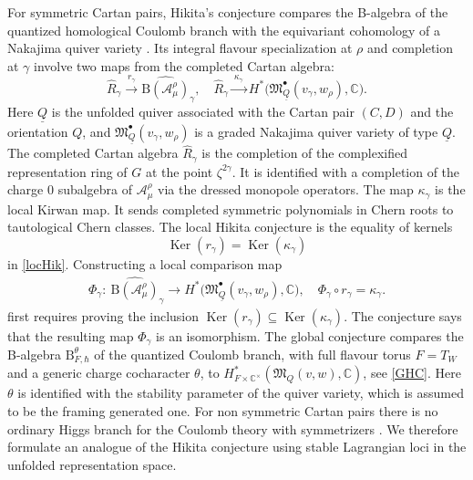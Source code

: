 \documentclass[11pt,reqno]{amsart}
\theoremstyle{definition}
\theoremstyle{remark}
\def\bbC{\mathbb C}
\def\dQ{\underline Q}
\def\B{\mathrm B}
\def\calA{\mathcal A}
\def\Ker{\operatorname{Ker}}
\def\M{\mathfrak M}
\begin{document}
For symmetric Cartan pairs, Hikita's conjecture compares the B-algebra of the quantized homological Coulomb
branch with the equivariant cohomology of a Nakajima quiver variety
\cite{HikNotes}. Its integral flavour specialization at $\rho$ and completion
at $\gamma$ involve two maps from the completed Cartan algebra:
\[
 \widehat R_\gamma\xrightarrow{\ r_\gamma\ }
 \widehat{\B(\calA_\mu^\rho)}_\gamma,
 \quad
 \widehat R_\gamma\xrightarrow{\ \kappa_\gamma\ }
 H^*\bigl(\M_{\dQ}^\bullet(v_\gamma,w_\rho),\bbC\bigr).
\]
Here $\dQ$ is the unfolded quiver associated with the Cartan pair $(C,D)$ and the orientation $Q$,
and $\M_{\dQ}^\bullet(v_\gamma,w_\rho)$ is a graded Nakajima quiver
variety \cite{Nak01} of type $\dQ$. 
The completed Cartan algebra $\widehat R_\gamma$ is the completion of the complexified representation ring
of $G$ at the point $\zeta^{2\gamma}$.  
It is identified with a completion of the charge 0 subalgebra of $\calA_\mu^\rho$
via the dressed monopole operators.
The map $\kappa_\gamma$ is the local Kirwan map. It sends completed symmetric
polynomials in Chern roots to tautological Chern classes. The
{local Hikita conjecture} is the equality of kernels
$$\Ker( r_\gamma)=\Ker(\kappa_\gamma)$$ in \eqref{locHik}.
Constructing a local comparison map 
\begin{align}\label{Phigamma}
 \Phi_\gamma:\ \widehat{\B(\calA_\mu^\rho)}_\gamma
 \longrightarrow
 H^*\bigl(\M_{\dQ}^\bullet(v_\gamma,w_\rho),\bbC\bigr),
 \quad \Phi_\gamma\circ r_\gamma=\kappa_\gamma.
\end{align}
first requires
proving the inclusion $\Ker (r_\gamma)\subseteq\Ker(\kappa_\gamma)$.
The conjecture says that the resulting map $\Phi_\gamma$ is an isomorphism.
The global conjecture compares the B-algebra
$\B^\theta_{F,\hbar}$ of the quantized Coulomb branch, with full
flavour torus $F=T_W$ and a generic charge cocharacter $\theta$, to
$H^*_{F\times\bbC^\times}(\M_Q(v,w),\bbC)$, see \eqref{GHC}.
Here $\theta$ is identified with  the stability parameter of the quiver variety, 
which is assumed to be the framing generated one.
For non symmetric Cartan pairs there is no ordinary
Higgs branch for the Coulomb theory with symmetrizers
\cite[\S1]{NW23}. We therefore formulate an analogue of the Hikita conjecture
using stable Lagrangian loci in the unfolded representation space.
\end{document}

